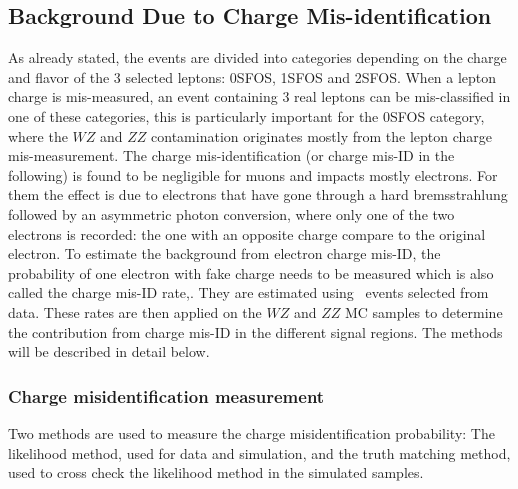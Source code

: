 \subsection{Background Due to Charge Mis-identification}
\label{sec:chargeMisID}

As already stated, the events are divided into categories depending on the charge and flavor of the 3 selected leptons: 0SFOS,
1SFOS and 2SFOS. When a lepton charge is mis-measured, 
an event containing 3 real leptons can be mis-classified in one of these categories, this is particularly important for the 0SFOS category, where the $WZ$ and $ZZ$ contamination originates mostly from the lepton charge mis-measurement.
The charge mis-identification (or charge mis-ID in the following) is found to be negligible for muons and impacts mostly electrons. For them
the effect is due to electrons that have gone through a
hard bremsstrahlung followed by an asymmetric photon conversion, where only one of the two electrons is recorded: the one with an opposite charge compare to the original electron.
To estimate the background from electron charge mis-ID, the probability of one electron with fake charge needs to be measured which is also called the charge mis-ID rate,. They are estimated using \Zee\ events
selected from data. These rates are then applied on the $WZ$ and $ZZ$ MC samples to determine the contribution from charge mis-ID in the different signal regions. The methods will be described in detail below.



\subsubsection{Charge misidentification measurement}

Two methods are used to measure the charge misidentification probability: The likelihood method, used for data and simulation, and the truth matching method, used to cross check the likelihood method in the simulated samples.

